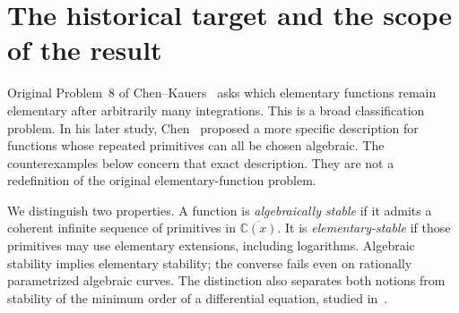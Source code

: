 \maketitle
\begin{abstract}
Chen's 2022 algebraic-stability conjecture proposes that algebraic functions
admitting arbitrarily many algebraic primitives are precisely finite
polynomial linear combinations of rational powers of shifted variables.
We give counterexamples in every degree $d\ge3$: an inverse branch of
$t^d+t=x$ has an infinite primitive tower in $\mathbb C[t]$, yet generates
a non-Galois extension of $\mathbb C(x)$ and therefore cannot belong to
the proposed class. More generally, every polynomial inverse is
algebraically stable, and it lies in that class exactly when its defining
polynomial has the form $a(t-b)^d+c$. For a fixed polynomial cover
$x=P(t)$, we classify all algebraically stable elements of $\mathbb C(t)$
as $\bigcup_{n\ge0}\delta^n\mathbb C[t]$, where
$\delta=P'(t)^{-1}d/dt$. Finite pole orders give an explicit bound reducing
membership to one polynomial linear system. The proofs use classical
substitution, field trace, valuations, and Galois theory. They refute
the stated 2022 conjecture, but do not solve the full elementary-function
classification in Chen--Kauers Problem~8. Historical priority is not
certified. Two exact verification programs are included in the single
TeX source.
\end{abstract}

\section{The historical target and the scope of the result}
Original Problem~8 of Chen--Kauers~\cite{CK2016} asks which elementary
functions remain elementary after arbitrarily many integrations.
This is a broad classification problem. In his later study,
Chen~\cite[Section~5]{Chen2022} proposed a more specific description
for functions whose repeated primitives can all be chosen algebraic.
The counterexamples below concern that exact description. They are
not a redefinition of the original elementary-function problem.

We distinguish two properties. A function is \emph{algebraically stable}
if it admits a coherent infinite sequence of primitives in
$\overline{\mathbb C(x)}$. It is \emph{elementary-stable} if those primitives
may use elementary extensions, including logarithms. Algebraic stability
implies elementary stability; the converse fails even on rationally
parametrized algebraic curves. The distinction also separates both
notions from stability of the minimum order of a differential equation,
studied in~\cite{CFGL2023}.

